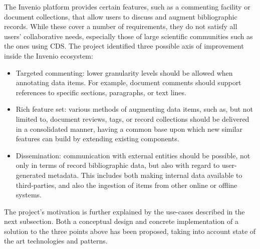 
The Invenio platform provides certain features, such as a commenting facility
or document collections, that allow users to discuss and augment bibliographic
records. While these cover a number of requirements, they do not satisfy all
users' collaborative needs, especially those of large scientific
communities such as the ones using CDS. The project identified three possible
axis of improvement inside the Invenio ecosystem:
\begin{itemize}
    \item Targeted commenting: lower granularity levels should be allowed when
      annotating  data items. For example, document comments
      should support references to specific sections, paragraphs, or text lines.
    \item Rich feature set: various methods of augmenting data items, such as,
      but not limited to, document reviews, tags, or record collections should
      be delivered in a consolidated manner, having a common base upon which new
      similar features can build by extending existing components.
    \item Dissemination: communication with external entities should be possible,
      not only in terms of record bibliographic data, but also with regard to
      user-generated metadata. This includes both making internal data available
      to third-parties, and also the ingestion of items from other online or
      offline systems.
\end{itemize}

The project's motivation is further explained by the use-cases described in the
next subsection. Both a conceptual design and concrete implementation of a
solution to the three points above has been proposed, taking into account state
of the art technologies and patterns.
